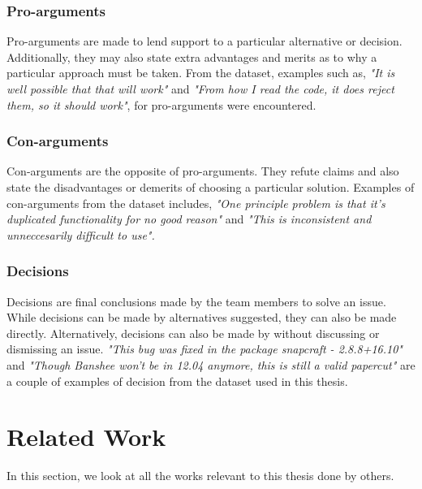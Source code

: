 \documentclass[a4paper,12pt,twoside]{report}
\begin{document}
\subsubsection{Pro-arguments}
Pro-arguments are made to lend support to a particular alternative or decision. Additionally, they may also state extra advantages and merits as to why a particular approach must be taken. From the dataset, examples such as, \textit{"It is well possible that that will work"} and \textit{"From how I read the code, it does reject them, so it should work"}, for pro-arguments were encountered. 

\subsubsection{Con-arguments}
Con-arguments are the opposite of pro-arguments. They refute claims and also state the disadvantages or demerits of choosing a particular solution. Examples of con-arguments from the dataset includes, \textit{"One principle problem is that it's duplicated functionality for no good reason"} and \textit{"This is inconsistent and unneccesarily difficult to use".}

\subsubsection{Decisions}
Decisions are final conclusions made by the team members to solve an issue. While decisions can be made by alternatives suggested, they can also be made directly. Alternatively, decisions can also be made by without discussing or dismissing an issue. \textit{"This bug was fixed in the package snapcraft - 2.8.8+16.10"} and \textit{"Though Banshee won't be in 12.04 anymore, this is still a valid papercut"} are a couple of examples of decision from the dataset used in this thesis.


\section{Related Work}

In this section, we look at all the works relevant to this thesis done by others. 
\end{document}
